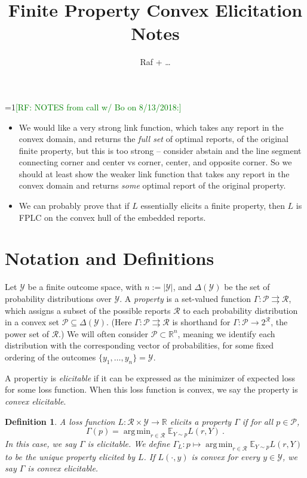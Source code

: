 \documentclass[11pt]{article}
\title{Finite Property Convex Elicitation Notes}
\author{Raf + \ldots}
\newcommand{\Comments}{1}
\newcommand{\mynote}[2]{\ifnum\Comments=1\textcolor{#1}{#2}\fi}
\newcommand{\raf}[1]{\mynote{green}{[RF: #1]}}
\newcommand{\reals}{\mathbb{R}}
\newcommand{\E}{\mathbb{E}}
\renewcommand{\P}{\mathcal{P}}
\newcommand{\R}{\mathcal{R}}
\newcommand{\Y}{\mathcal{Y}}
\newcommand{\toto}{\rightrightarrows}
\DeclareMathOperator*{\argmin}{arg\,min}
\newtheorem{definition}{Definition}
\begin{document}
\maketitle

\raf{NOTES from call w/ Bo on 8/13/2018:}
\begin{itemize}
\item We would like a very strong link function, which takes any report in the convex domain, and returns the \emph{full set} of optimal reports, of the original finite property, but this is too strong -- consider abstain and the line segment connecting corner and center vs corner, center, and opposite corner.
So we should at least show the weaker link function that takes any report in the convex domain and returns \emph{some} optimal report of the original property.
\item We can probably prove that if $L$ essentially elicits a finite property, then $L$ is FPLC on the convex hull of the embedded reports.
\end{itemize}

\section{Notation and Definitions}

Let $\Y$ be a finite outcome space, with $n:=|\Y|$, and $\Delta(\Y)$ be the set of probability distributions over $\Y$.
A \emph{property} is a set-valued function $\Gamma: \P \toto \R$, which assigns a subset of the possible reports $\R$ to each probability distribution in a convex set $\P \subseteq \Delta(\Y)$.
(Here $\Gamma: \P \toto \R$ is shorthand for $\Gamma: \P \to 2^\R$, the power set of $\R$.)
We will often consider $\P \subset \reals^n$, meaning we identify each distribution with the corresponding vector of probabilities, for some fixed ordering of the outcomes $\{y_1,\ldots,y_n\} = \Y$.

A propertiy is \emph{elicitable} if it can be expressed as the minimizer of expected loss for some loss function.
When this loss function is convex, we say the property is \emph{convex elicitable}.
\begin{definition}
  \label{def:elicits}
  A loss function $L: \R \times \Y \to \reals$ \emph{elicits} a property $\Gamma$ if for all $p \in \P$,
  \begin{equation}
    \label{eq:elicits}
    \Gamma(p) = \argmin_{r\in\R} \E_{Y \sim p} L(r, Y)~.
  \end{equation}
  In this case, we say $\Gamma$ is \emph{elicitable}.
  We define $\Gamma_L:p\mapsto \argmin_{r\in\R} \E_{Y \sim p} L(r, Y)$ to be the unique property elicited by $L$.
  If $L(\cdot,y)$ is convex for every $y \in \Y$, we say $\Gamma$ is \emph{convex elicitable}.
\end{definition}
\end{document}

